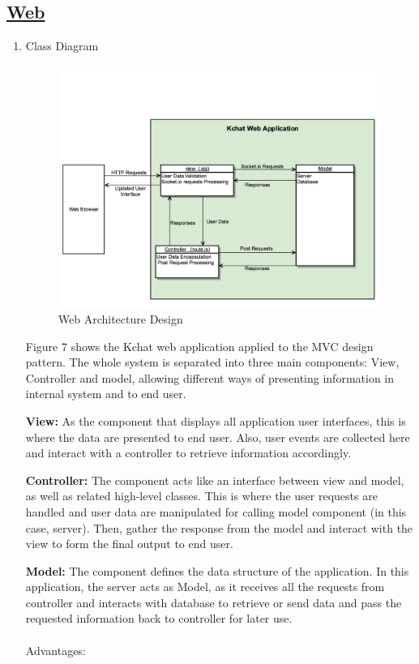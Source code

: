 \documentclass{article}
\begin{document}
	\subsection{\underline{\textbf{Web}}}
		\begin{enumerate}
		\item Class Diagram
		
		\begin{figure}[H]
			\centering
			\includegraphics[scale=0.2]{webapp_architecture_diagram.png}
			\caption{Web Architecture Design}
		\end{figure}
		Figure 7 shows the Kchat web application applied to the MVC design pattern. The whole system is separated into three main components: View, Controller and model, allowing different ways of presenting information in internal system and to end user. \par
		\textbf{View:} As the component that displays all application user interfaces, this is where the data are presented to end user. Also, user events are collected here and interact with a controller to retrieve information accordingly. \par
		\textbf{Controller:} The component acts like an interface between view and model, as well as related high-level classes. This is where the user requests are handled and user data are manipulated for calling model component (in this case, server). Then, gather the response from the model and interact with the view to form the final output to end user. \par
		\textbf{Model:} The component defines the data structure of the application. In this application, the server acts as Model, as it receives all the requests from controller and interacts with database to retrieve or send data and pass the requested information back to controller for later use. \\ \\
		Advantages:
		

\end{enumerate}
\end{document}

